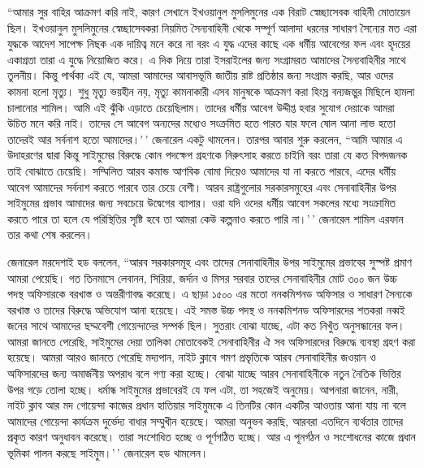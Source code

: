 \documentclass[
]{book}
\begin{document}
``আমার সুর বাহির আক্রমণ করি নাই, কারণ সেখানে ইখওয়ানুল মুসলিমুনের এক বিরাট স্বেচ্ছাসেবক বাহিনী মোতায়েন ছিল। ইখওয়ানুল মুসলিমুনের স্বেচ্ছাসেবকরা নিয়মিত সৈন্যবাহিনী থেকে সম্পূর্ণ আলাদা ধরনের সাধারণ সৈন্যের মত এরা যুদ্ধকে আদেশ সাপেক্ষ নিছক এক দায়িত্ব মনে করে না বরং এ যুদ্ধ এদের কাছে এক ধর্মীয় আবেগের ফল এবং হৃদয়ের একাগ্রতা তারা এ যুদ্ধে নিয়োজিত করে। এ দিক দিয়ে তারা ইসরাইলের জন্য সংগ্রামরত আমাদের সৈন্যবাহিনীর সাথে তুলনীয়। কিন্তু পার্থক্য এই যে, আমরা আমাদের আবাসভূমি জাতীয় রাষ্ট প্রতিষ্ঠার জন্য সংগ্রাম করছি, আর ওদের কামনা হলো মৃত্যু। শুধু মৃত্যু ভয়হীন নয়, মৃত্যু কামনাকারী এসব মানুষকে আক্রমণ করা হিংস্র বন্যজন্তুর মিছিলে হামলা চালানোর শামিল। আমি এই ঝুঁকি এড়াতে চেয়েছিলাম। তাদের ধর্মীয় আবেগ উদ্দীপ্ত হবার সুযোগ দেয়াকে আমরা উচিত মনে করি নাই। তাদের সে আবেগ অন্যদের মধ্যেও সংক্রমিত হতে পারত যার ফলে ষোল আনা লাভ হতো তাদেরই আর সর্বনাশ হতো আমাদের।'\,' জেনারেল একটু থামলেন। তারপর আবার শুরু করলেন, ``আমি আমার এ উদাহরণের দ্বারা কিন্তু সাইমুমের বিরুদ্ধে কোন পদক্ষেপ গ্রহণকে নিরুৎসাহ করতে চাইনি বরং তারা যে কত বিপদজনক তাই বোঝাতে চেয়েছি। সম্মিলিত আরব কমান্ড আণবিক বোমা দিয়েও আমাদের যা না করতে পারবে, এদের ধর্মীয় আবেগ আমাদের সর্বনাশ করতে পারবে তার চেয়ে বেশী। আরব রাষ্ট্রগুলোর সরকারসমুহের এবং সেনাবাহিনীর উপর সাইমুমের প্রভাব আমাদের জন্য সবচেয়ে উদ্বেগের ব্যাপার। ওরা যদি ওদের ধর্মীয় আবেগ সকলের মধ্যে সংক্রামিত করতে পারে তা হলে যে পরিস্থিতির সৃষ্টি হবে তা আমরা কেউ কল্পনাও করতে পারি না।'\,' জেনারেল শামিল এরফান তার কথা শেষ করলেন।

জেনারেল মরদেশাই হড বললেন, ``আরব সরকারসমূহ এবং তাদের সেনাবাহিনীর উপর সাইমুমের প্রভাবের সুস্পষ্ট প্রমাণ আমরা পেয়েছি। গত তিনমাসে লেবানন, সিরিয়া, জর্দান ও মিসর সরবার তাদের সেনাবাহিনীর মোট ৩০০ জন উচ্চ পদস্থ অফিসারকে বরখাস্ত ও অন্তরীণাবদ্ধ করেছে। এ ছাড়া ১৫০০ এর মতো ননকমিশনড অফিসার ও সাধারণ সৈন্যকে বরখাস্ত ও তাদের বিরুদ্ধে অভিযোগ আনা হয়েছে। এই সমস্ত উচ্চ পদস্থ ও ননকমিশনড অফিসারদের শতকরা নব্বই জনের সাথে আমাদের ছদ্মবেশী গোয়েন্দাদের সম্পর্ক ছিল। সুতরাং বোঝা যাচ্ছে, এটা কত নিখুঁত অনুসন্ধানের ফল। আমরা জানতে পেরেছি, সাইমুমের দেয়া তালিকা মোতাবেকই সেনাবাহিনীর ঐ সব অফিসারদের বিরুদ্ধে ব্যবস্থা গ্রহণ করা হয়েছে। আমরা আরও জানতে পেরেছি মদ্যপান, নাইট ক্লাবে গমণ প্রভৃতিকে আরব সেনাবাহিনীর জওয়ান ও অফিসারদের জন্য অমার্জনীয় অপরাধ বলে গণ্য করা হচ্ছে। বোঝা যাচ্ছে আরব সেনাবাহিনীকে নতুন নৈতিক ভিত্তির উপর গড়ে তোলা হচ্ছে। ধর্মান্ধ সাইমুমের প্রভাবেরই যে ফল এটা, তা সহজেই অনুমেয়। আপনারা জানেন, নারী, নাইট ক্লাব আর মদ গোয়েন্দা কাজের প্রধান হাতিয়ার সাইমুমকে এ তিনটির কোন একটির আওতায় আনা যায় না বলে আমাদের গোয়েন্দা কার্যক্রম দুর্ভেদ্য বাধার সম্মুখীন হয়েছে। আমরা অনুভব করছি, আরবরা এতদিনে ব্যর্থতার তাদের প্রকৃত কারণ অনুধাবন করেছে। তারা সংশোধিত হচ্ছে ও পূর্ণগঠিত হচ্ছে। আর এ পূনর্গঠন ও সংশোধনের কাজে প্রধান ভূমিকা পালন করছে সাইমুম।'\,' জেনারেল হড থামলেন।
\end{document}
